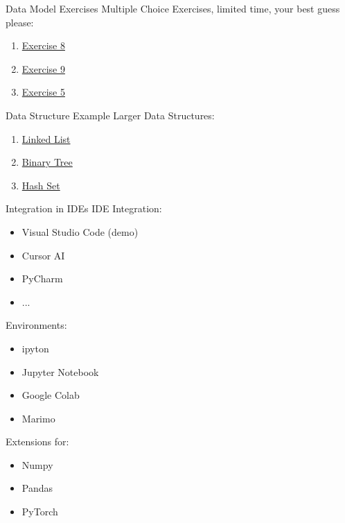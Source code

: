 \documentclass[10pt, colorlinks=true, urlcolor=blue]{beamer}
\begin{document}
\begin{frame}{Data Model Exercises}
  Multiple Choice Exercises, limited time, your best guess please:
  \begin{enumerate}
  \item \href{https://memory-graph.com/\#codeurl=https://raw.githubusercontent.com/bterwijn/memory_graph_videos/refs/heads/main/exercises/exercise8.py}{Exercise 8}
  \item \href{https://memory-graph.com/\#codeurl=https://raw.githubusercontent.com/bterwijn/memory_graph_videos/refs/heads/main/exercises/exercise9.py}{Exercise 9}
  \item \href{https://memory-graph.com/\#codeurl=https://raw.githubusercontent.com/bterwijn/memory_graph_videos/refs/heads/main/exercises/exercise5.py}{Exercise 5}
  \end{enumerate}
\end{frame}


\begin{frame}{Data Structure Example}
Larger Data Structures:
\begin{enumerate}
\item \href{https://memory-graph.com/\#codeurl=https://raw.githubusercontent.com/bterwijn/memory_graph/refs/heads/main/src/linked_list.py&timestep=0.2&play}{Linked List}
\item \href{https://memory-graph.com/\#codeurl=https://raw.githubusercontent.com/bterwijn/memory_graph/refs/heads/main/src/bin_tree.py&timestep=0.2&play}{Binary Tree}
\item \href{https://memory-graph.com/\#codeurl=https://raw.githubusercontent.com/bterwijn/memory_graph/refs/heads/main/src/hash_set.py&timestep=0.2&play}{Hash Set}
\end{enumerate}
\end{frame}

\begin{frame}{Integration in IDEs}
  IDE Integration:
  \begin{itemize}
    \item Visual Studio Code (demo)
    \item Cursor AI
    \item PyCharm
    \item ...
  \end{itemize}

  Environments:
  \begin{itemize}
    \item ipyton
    \item Jupyter Notebook
    \item Google Colab
    \item Marimo
  \end{itemize}

  Extensions for:
  \begin{itemize}
    \item Numpy
    \item Pandas
    \item PyTorch
  \end{itemize}
\end{frame}
\end{document}
